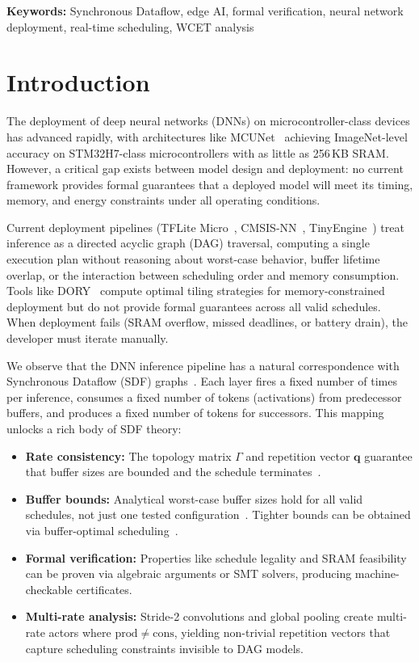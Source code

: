 \documentclass[journal]{IEEEtran}
\begin{document}
\noindent\textbf{Keywords:} Synchronous Dataflow, edge AI, formal verification, neural network deployment, real-time scheduling, WCET analysis

\section{Introduction}

The deployment of deep neural networks (DNNs) on microcontroller-class devices has advanced rapidly, with architectures like MCUNet~\cite{lin2020mcunet} achieving ImageNet-level accuracy on STM32H7-class microcontrollers with as little as 256\,KB SRAM.
However, a critical gap exists between model design and deployment: no current framework provides formal guarantees that a deployed model will meet its timing, memory, and energy constraints under all operating conditions.

Current deployment pipelines (TFLite Micro~\cite{david2021tflite}, CMSIS-NN~\cite{lai2018cmsis}, TinyEngine~\cite{lin2020mcunet}) treat inference as a directed acyclic graph (DAG) traversal, computing a single execution plan without reasoning about worst-case behavior, buffer lifetime overlap, or the interaction between scheduling order and memory consumption.
Tools like DORY~\cite{burrello2021dory} compute optimal tiling strategies for memory-constrained deployment but do not provide formal guarantees across all valid schedules.
When deployment fails (SRAM overflow, missed deadlines, or battery drain), the developer must iterate manually.

We observe that the DNN inference pipeline has a natural correspondence with Synchronous Dataflow (SDF) graphs~\cite{lee1987sdf}.
Each layer fires a fixed number of times per inference, consumes a fixed number of tokens (activations) from predecessor buffers, and produces a fixed number of tokens for successors.
This mapping unlocks a rich body of SDF theory:
\begin{itemize}[nosep]
\item \textbf{Rate consistency:} The topology matrix $\Gamma$ and repetition vector $\mathbf{q}$ guarantee that buffer sizes are bounded and the schedule terminates~\cite{lee1987sdf}.
\item \textbf{Buffer bounds:} Analytical worst-case buffer sizes hold for all valid schedules, not just one tested configuration~\cite{bhattacharyya1996software}. Tighter bounds can be obtained via buffer-optimal scheduling~\cite{murthy2004buffer}.
\item \textbf{Formal verification:} Properties like schedule legality and SRAM feasibility can be proven via algebraic arguments or SMT solvers, producing machine-checkable certificates.
\item \textbf{Multi-rate analysis:} Stride-2 convolutions and global pooling create multi-rate actors where $\mathrm{prod} \neq \mathrm{cons}$, yielding non-trivial repetition vectors that capture scheduling constraints invisible to DAG models.
\end{itemize}
\end{document}
